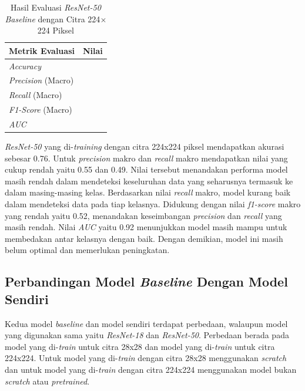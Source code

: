 \begin{table}[H]
    \centering
    \caption{Hasil Evaluasi \textit{ResNet-50 Baseline} dengan Citra 224$\times$224 Piksel}
    \label{tab:hasil_resnet50baseline_224}
    \begin{tabular}{>{\raggedright\arraybackslash}m{} 
                    >{\centering\arraybackslash}m{}}
        \toprule
        \textbf{Metrik Evaluasi} & \textbf{Nilai} \\
        \midrule
        \textit{Accuracy} & 0.76 \\
        \textit{Precision} (Macro) & 0.55 \\
        \textit{Recall} (Macro) & 0.49 \\
        \textit{F1-Score} (Macro) & 0.52 \\
        \textit{AUC} & 0.92 \\
        \bottomrule
    \end{tabular}
\end{table}

\textit{ResNet-50} yang di-\textit{training} dengan citra 224x224 piksel 
mendapatkan akurasi sebesar 0.76. Untuk \textit{precision} makro dan 
\textit{recall} makro mendapatkan nilai yang cukup rendah yaitu 0.55 
dan 0.49. Nilai tersebut menandakan performa model masih rendah dalam 
mendeteksi keseluruhan data yang seharusnya termasuk ke dalam masing-masing 
kelas. Berdasarkan nilai \textit{recall} makro, model kurang baik dalam 
mendeteksi data pada tiap kelasnya. Didukung dengan nilai 
\textit{f1-score} makro yang rendah yaitu 0.52, menandakan keseimbangan 
\textit{precision} dan \textit{recall} yang masih rendah. Nilai \textit{AUC} 
yaitu 0.92 menunjukkan model masih mampu untuk membedakan antar kelasnya 
dengan baik. Dengan demikian, model ini masih belum optimal dan memerlukan 
peningkatan. \par


\subsection{Perbandingan Model \textit{Baseline} Dengan Model Sendiri} \label{IV.Perbandingan_Model}
Kedua model \textit{baseline} dan model sendiri terdapat perbedaan, 
walaupun model yang digunakan sama yaitu \textit{ResNet-18} dan \textit{ResNet-50}. 
Perbedaan berada pada model yang di-\textit{train} untuk citra 28x28 dan 
model yang di-\textit{train} untuk citra 224x224. Untuk model yang 
di-\textit{train} dengan citra 28x28 menggunakan \textit{scratch} dan 
untuk model yang di-\textit{train} dengan citra 224x224 menggunakan model 
bukan \textit{scratch} atau \textit{pretrained}. \par 


